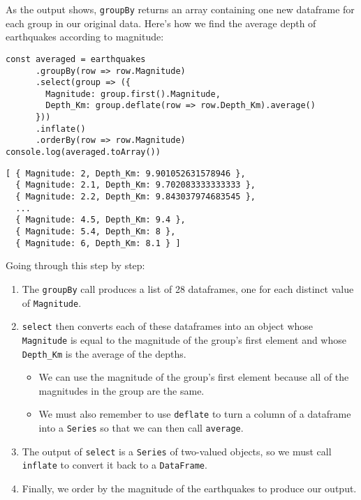 As the output shows,
\texttt{groupBy} returns an array containing one new dataframe for each group in our original data.
Here's how we find the average depth of earthquakes according to magnitude:

\begin{verbatim}
const averaged = earthquakes
      .groupBy(row => row.Magnitude)
      .select(group => ({
        Magnitude: group.first().Magnitude,
        Depth_Km: group.deflate(row => row.Depth_Km).average()
      }))
      .inflate()
      .orderBy(row => row.Magnitude)
console.log(averaged.toArray())
\end{verbatim}

\begin{verbatim}
[ { Magnitude: 2, Depth_Km: 9.901052631578946 },
  { Magnitude: 2.1, Depth_Km: 9.702083333333333 },
  { Magnitude: 2.2, Depth_Km: 9.843037974683545 },
  ...
  { Magnitude: 4.5, Depth_Km: 9.4 },
  { Magnitude: 5.4, Depth_Km: 8 },
  { Magnitude: 6, Depth_Km: 8.1 } ]
\end{verbatim}

Going through this step by step:

\begin{enumerate}

\item
  The \texttt{groupBy} call produces a list of 28 dataframes,
  one for each distinct value of \texttt{Magnitude}.

\item
  \texttt{select} then converts each of these dataframes into an object
  whose \texttt{Magnitude} is equal to the magnitude of the group's first element
  and whose \texttt{Depth\_Km} is the average of the depths.
  \begin{itemize}
  \item
    We can use the magnitude of the group's first element because all of the magnitudes in the group are the same.
  \item
    We must also remember to use \texttt{deflate} to turn a column of a dataframe into a \texttt{Series}
    so that we can then call \texttt{average}.
  \end{itemize}

\item
  The output of \texttt{select} is a \texttt{Series} of two-valued objects,
  so we must call \texttt{inflate} to convert it back to a \texttt{DataFrame}.

\item
  Finally,
  we order by the magnitude of the earthquakes to produce our output.
  
\end{enumerate}

